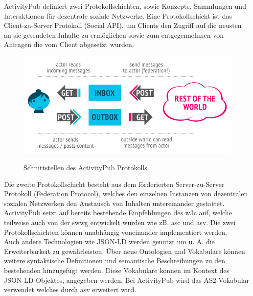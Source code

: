 {		ActivityPub definiert zwei Protokollschichten, sowie Konzepte, Sammlungen und Interaktionen für dezentrale soziale Netzwerke. Eine Protokollschicht ist das Client-zu-Server Protokoll (Social API), um Clients den Zugriff auf die neusten an sie gesendeten Inhalte zu ermöglichen sowie zum entgegennehmen von Anfragen die vom Client abgesetzt wurden\cite{activityPub}.\\ 
		
		\begin{figure}[h]
			\begin{minipage}{\textwidth}
				\centering
				\includegraphics[scale=0.55]{figures/client-server-federated.png}
				\label{Client zu Server und Server zu Server Interaktionen}
				\caption{Schnittstellen des ActivityPub Protokolls}
			\end{minipage}
		\end{figure}
		
		Die zweite Protokollschicht besteht aus dem förderierten Server-zu-Server Protokoll (Federation Protocol), welches den einzelnen Instanzen von dezentralen sozialen Netzwerken den Austausch von Inhalten untereinander gestattet. ActivityPub setzt auf bereits bestehende Empfehlungen des \gls{w3c} auf, welche teilweise auch von der \gls{swwg} entwickelt wurden wie zB. \gls{asc} und \gls{asv}\cite{activityPub}. Die zwei Protokollschichten können unabhängig voneinander implementiert werden.\\
		
		Auch andere Technologien wie \gls{JSON-LD} werden genutzt um u. A. die Erweiterbarkeit zu gewährleisten. Über neue Ontologien und Vokabulare können weitere syntaktische Definitionen und semantische Beschreibungen zu den bestehenden hinzugefügt werden\cite{activityPub}. Diese Vokabulare können im Kontext des \gls{JSON-LD} Objektes, angegeben werden. Bei ActivityPub wird das \gls{AS2} Vokabular verwendet welches durch \gls{asv} erweitert wird.
	}
